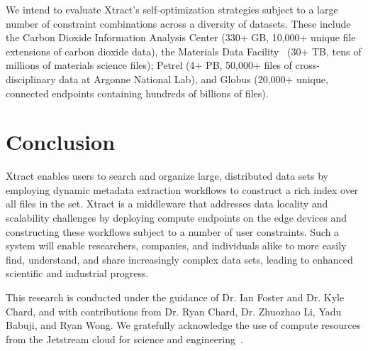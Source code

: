 \documentclass[sigconf, 9pt]{acmart}
\newcommand{\name}{Xtract}
\begin{document}
We intend to evaluate \name{}'s self-optimization strategies subject to a large number of constraint combinations across a diversity of datasets. 
These include the Carbon Dioxide Information Analysis Center (330+ GB, 10,000+ 
unique file extensions of carbon dioxide data), the Materials Data Facility~\cite{ blaiszik2019mdf} (30+ TB, tens of millions of materials science files); 
Petrel (4+ PB, 50,000+ files of cross-disciplinary data at Argonne National Lab), and Globus (20,000+ unique, connected 
endpoints containing hundreds of billions of files).


\section{Conclusion}
\label{sec:conc}

\name{} enables users to search and organize large, distributed data sets by employing dynamic metadata extraction workflows to construct a rich index over all files in the set.
\name{} is a middleware that addresses data locality and scalability challenges by deploying compute endpoints on the edge
devices and constructing these workflows subject to a number of user constraints. Such a system will enable researchers, companies, and individuals alike to more easily find, understand, and share increasingly 
complex data sets, leading to enhanced scientific and industrial progress. 


\begin{acks}

This research is conducted under the guidance of Dr. Ian Foster and Dr. Kyle Chard, and with contributions
from Dr. Ryan Chard, Dr. Zhuozhao Li, Yadu Babuji, and Ryan Wong. We gratefully acknowledge the use of compute 
resources from the Jetstream cloud for science and engineering~\cite{jetstream}.


\end{acks}


\end{document}

